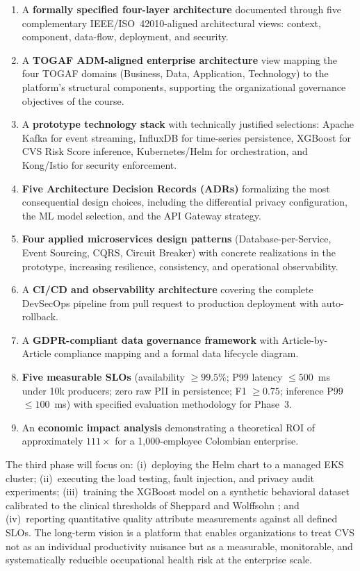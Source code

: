 \documentclass[conference]{IEEEtran}
\begin{document}
\begin{enumerate}
  \item A \textbf{formally specified four-layer architecture} documented through five
        complementary IEEE/ISO~42010-aligned architectural views: context, component,
        data-flow, deployment, and security.
  \item A \textbf{TOGAF ADM-aligned enterprise architecture} view mapping the four
        TOGAF domains (Business, Data, Application, Technology) to the platform's
        structural components, supporting the organizational governance objectives of
        the course.
  \item A \textbf{prototype technology stack} with technically justified selections:
        Apache Kafka for event streaming, InfluxDB for time-series persistence,
        XGBoost for CVS Risk Score inference, Kubernetes/Helm for orchestration, and
        Kong/Istio for security enforcement.
  \item \textbf{Five Architecture Decision Records (ADRs)} formalizing the most
        consequential design choices, including the differential privacy configuration,
        the ML model selection, and the API Gateway strategy.
  \item \textbf{Four applied microservices design patterns} (Database-per-Service,
        Event Sourcing, CQRS, Circuit Breaker) with concrete realizations in the
        prototype, increasing resilience, consistency, and operational observability.
  \item A \textbf{CI/CD and observability architecture} covering the complete DevSecOps
        pipeline from pull request to production deployment with auto-rollback.
  \item A \textbf{GDPR-compliant data governance framework} with Article-by-Article
        compliance mapping and a formal data lifecycle diagram.
  \item \textbf{Five measurable SLOs} (availability $\geq 99.5\%$; P99 latency
        $\leq 500$~ms under 10k producers; zero raw PII in persistence; F1 $\geq 0.75$;
        inference P99 $\leq 100$~ms) with specified evaluation methodology for Phase~3.
  \item An \textbf{economic impact analysis} demonstrating a theoretical ROI of
        approximately $111\times$ for a 1,000-employee Colombian enterprise.
\end{enumerate}

The third phase will focus on: (i)~deploying the Helm chart to a managed EKS cluster;
(ii)~executing the load testing, fault injection, and privacy audit experiments;
(iii)~training the XGBoost model on a synthetic behavioral dataset calibrated to
the clinical thresholds of Sheppard and Wolffsohn \cite{b2}; and (iv)~reporting
quantitative quality attribute measurements against all defined SLOs. The long-term
vision is a platform that enables organizations to treat CVS not as an individual
productivity nuisance but as a measurable, monitorable, and systematically reducible
occupational health risk at the enterprise scale.
\end{document}
